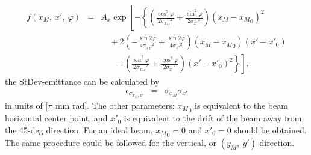 \documentclass{article}
\begin{document}
\begin{eqnarray*}
f(x_M,\ x',\ \varphi) & = & A_x \exp \left[ -\left\{ \left( \frac{\cos^2{\varphi}}{2{\sigma_{x_M}}^2} + \frac{\sin^2{\varphi}}{2{\sigma_{x'}}^2} \right) \left( x_M-{x_M}_0 \right)^2 \right. \right. \\
& & \, \, \, \, \, \, + 2 \left( -\frac{\sin{2\varphi}}{4{\sigma_{x_M}}^2} + \frac{\sin{2\varphi}}{4{\sigma_{x'}}^2} \right) \left( x_M-{x_M}_0 \right) \left( x'-{x'}_0 \right) \\
& & \, \, \, \, \, \, \, \, \, \, \, \, \left. \left. + \left( \frac{\sin^2{\varphi}}{2{\sigma_{x_M}}^2} + \frac{\cos^2{\varphi}}{2{\sigma_{x'}}^2} \right) \left( x'-{x'}_0 \right)^2 \right\} \right],
\end{eqnarray*}
the StDev-emittance can be calculated by
\begin{eqnarray*}
\epsilon_{\sigma_{x_M,x'}} & = & \sigma_{x_M} \sigma_{x'}
\end{eqnarray*}
in units of [$\pi$ mm rad]. The other parameters: ${x_M}_0$ is equivalent to the beam horizontal center point, and ${x'}_0$ is equivalent to the drift of the beam away from the 45-deg direction. For an ideal beam, ${x_M}_0 = 0$ and ${x'}_0 = 0$ should be obtained. The same procedure could be followed for the vertical, or $(y_M,\ y')$ direction.
\end{document}
